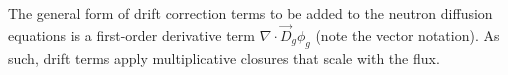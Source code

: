 \documentclass[letterpaper]{mc2025}
\begin{document}
% 


The general form of drift correction terms to be added to the neutron diffusion equations is a
first-order derivative term $\nabla\cdot \vec{D}_g\phi_g$ (note the vector notation). As such,
drift terms apply multiplicative closures that scale with the flux.
\end{document}
